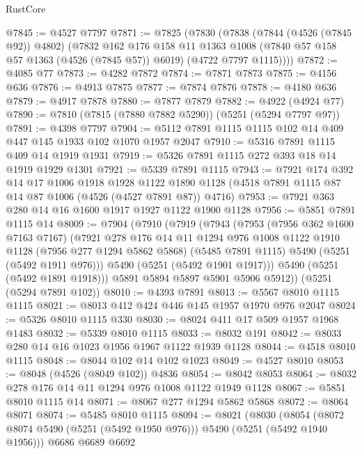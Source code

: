 \begin{lexlean}{RustCore}
\begin{coremodule}
@7845 := @4527 @7797
@7871 := @7825
    (@7830
      (@7838
        (@7844 (@4526 (@7845 @92)) @4802)
        (@7832
          @162
          @176
          @158
          @11
          @1363
          @1008
          (@7840 @57 @158 @57 @1363 (@4526 (@7845 @57)) @6019)
          (@4722 @7797 @1115))))
@7872 := @4085 @77
@7873 := @4282 @7872
@7874 := @7871 @7873
@7875 := @4156 @636
@7876 := @4913 @7875
@7877 := @7874 @7876
@7878 := @4180 @636
@7879 := @4917 @7878
@7880 := @7877 @7879
@7882 := @4922 (@4924 @77)
@7890 := @7810 (@7815 (@7880 @7882 @5290)) (@5251 (@5294 @7797 @97))
@7891 := @4398 @7797
@7904 := @5112 @7891 @1115 @1115 @102 @14 @409 @447 @145 @1933 @102 @1070 @1957 @2047
@7910 := @5316 @7891 @1115 @409 @14 @1919 @1931
@7919 := @5326 @7891 @1115 @272 @393 @18 @14 @1919 @1929 @1301
@7921 := @5339 @7891 @1115
@7943 := @7921
    @174
    @392
    @14
    @17
    @1006
    @1918
    @1928
    @1122
    @1890
    @1128
    (@4518 @7891 @1115 @87 @14 @87 @1006 (@4526 (@4527 @7891 @87)) @4716)
@7953 := @7921 @363 @280 @14 @16 @1600 @1917 @1927 @1122 @1900 @1128
@7956 := @5851 @7891 @1115 @14
@8009 := @7904
    (@7910
      (@7919
        (@7943
          (@7953
            (@7956 @362 @1600 @7163 @7167)
            (@7921
              @278
              @176
              @14
              @11
              @1294
              @976
              @1008
              @1122
              @1910
              @1128
              (@7956 @277 @1294 @5862 @5868)
              (@5485 @7891 @1115)
              @5490
              (@5251 (@5492 @1911 @976)))
            @5490
            (@5251 (@5492 @1901 @1917)))
          @5490
          (@5251 (@5492 @1891 @1918)))
        @5891
        @5894
        @5897
        @5901
        @5906
        @5912))
    (@5251 (@5294 @7891 @102))
@8010 := @4393 @7891
@8013 := @5567 @8010 @1115 @1115
@8021 := @8013 @412 @424 @446 @145 @1957 @1970 @976 @2047
@8024 := @5326 @8010 @1115 @330
@8030 := @8024 @411 @17 @509 @1957 @1968 @1483
@8032 := @5339 @8010 @1115
@8033 := @8032 @191
@8042 := @8033 @280 @14 @16 @1023 @1956 @1967 @1122 @1939 @1128
@8044 := @4518 @8010 @1115
@8048 := @8044 @102 @14 @102 @1023
@8049 := @4527 @8010
@8053 := @8048 (@4526 (@8049 @102)) @4836
@8054 := @8042 @8053
@8064 := @8032 @278 @176 @14 @11 @1294 @976 @1008 @1122 @1949 @1128
@8067 := @5851 @8010 @1115 @14
@8071 := @8067 @277 @1294 @5862 @5868
@8072 := @8064 @8071
@8074 := @5485 @8010 @1115
@8094 := @8021
    (@8030
      (@8054 (@8072 @8074 @5490 (@5251 (@5492 @1950 @976))) @5490 (@5251 (@5492 @1940 @1956)))
      @6686
      @6689
      @6692

\end{coremodule}
\end{lexlean}
